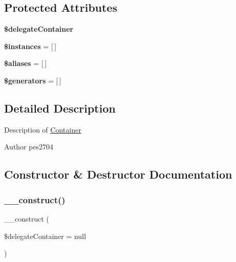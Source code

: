 \subsection*{Protected Attributes}
\begin{DoxyCompactItemize}
\item 
\mbox{\label{class_pes_1_1_container_1_1_container_ad2da35288e6f04dc1e89590f4c169641}} 
{\bfseries \$delegate\+Container}
\item 
\mbox{\label{class_pes_1_1_container_1_1_container_a1a63b63bdad280ed9a89dfed1fadc771}} 
{\bfseries \$instances} = \mbox{[}$\,$\mbox{]}
\item 
\mbox{\label{class_pes_1_1_container_1_1_container_a7e6d29edbd9ec5d8ec9d478cf98fba03}} 
{\bfseries \$aliases} = \mbox{[}$\,$\mbox{]}
\item 
\mbox{\label{class_pes_1_1_container_1_1_container_ace7b660a849b86c84e72dba979f2d182}} 
{\bfseries \$generators} = \mbox{[}$\,$\mbox{]}
\end{DoxyCompactItemize}


\subsection{Detailed Description}
Description of \mbox{\hyperlink{class_pes_1_1_container_1_1_container}{Container}}

\begin{DoxyAuthor}{Author}
pes2704 
\end{DoxyAuthor}


\subsection{Constructor \& Destructor Documentation}
\mbox{\label{class_pes_1_1_container_1_1_container_a8e12a4a1a37991b6fd64ca2eb415d152}} 
\subsubsection{\texorpdfstring{\+\_\+\+\_\+construct()}{\_\_construct()}}
{\footnotesize\ttfamily \+\_\+\+\_\+construct (\begin{DoxyParamCaption}\item[{Container\+Interface}]{\$delegate\+Container = {\ttfamily null} }\end{DoxyParamCaption})}

